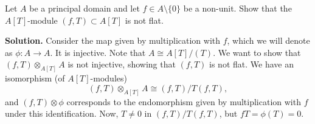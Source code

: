 \documentclass[a4paper,11pt]{article}
\begin{document}
Let $A$ be a principal domain and let $f \in A \setminus \{0\}$ be a 
non-unit. Show that the $A[T]$-module $(f,T) \subset A[T]$ is not flat. 

\textbf{Solution.}
Consider the map given by multiplication with $f$, which we will 
denote as $\phi: A \to A$. It is injective. Note that $A \cong A[T]/(T)$. 
We want to show that $(f,T) \otimes_{A[T]} A$ is not injective, 
showing that $(f,T)$ is not flat. We have an isomorphism (of $A[T]$-modules)
$$(f,T) \otimes_{A[T]} A \cong (f,T) / T (f,T),$$
and $(f,T) \otimes \phi$ corresponds to the endomorphism given by multiplication
with $f$ under this identification.
Now, $T \neq 0$ in $(f,T)/T(f,T)$, but $fT = \phi(T) = 0$. 

\contactend
\end{document}
